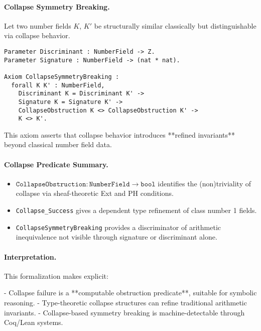 \documentclass[11pt]{article}
\begin{document}
\paragraph{Collapse Symmetry Breaking.}

Let two number fields \( K \), \( K' \) be structurally similar classically but distinguishable via collapse behavior.

\begin{lstlisting}[language=Coq]
Parameter Discriminant : NumberField -> Z.
Parameter Signature : NumberField -> (nat * nat).

Axiom CollapseSymmetryBreaking :
  forall K K' : NumberField,
    Discriminant K = Discriminant K' ->
    Signature K = Signature K' ->
    CollapseObstruction K <> CollapseObstruction K' ->
    K <> K'.
\end{lstlisting}

This axiom asserts that collapse behavior introduces **refined invariants** beyond classical number field data.

\paragraph{Collapse Predicate Summary.}

\begin{itemize}
  \item \( \texttt{CollapseObstruction} : \texttt{NumberField} \to \texttt{bool} \)  
  identifies the (non)triviality of collapse via sheaf-theoretic Ext and PH conditions.
\end{itemize}
  
\begin{itemize}
  \item \texttt{Collapse\_Success} gives a dependent type refinement of class number 1 fields.

  \item \texttt{CollapseSymmetryBreaking} provides a discriminator of arithmetic inequivalence  
  not visible through signature or discriminant alone.
\end{itemize}


\paragraph{Interpretation.}

This formalization makes explicit:

- Collapse failure is a **computable obstruction predicate**, suitable for symbolic reasoning.
- Type-theoretic collapse structures can refine traditional arithmetic invariants.
- Collapse-based symmetry breaking is machine-detectable through Coq/Lean systems.
\end{document}
